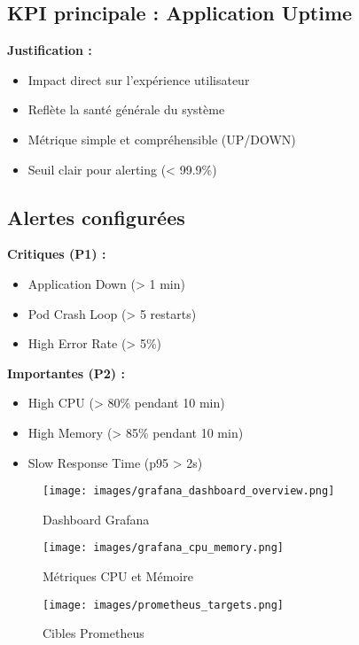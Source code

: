 \documentclass[11pt,a4paper]{article}
\begin{document}
\subsection{KPI principale : Application Uptime}
\textbf{Justification :}
\begin{itemize}
    \item Impact direct sur l'expérience utilisateur
    \item Reflète la santé générale du système
    \item Métrique simple et compréhensible (UP/DOWN)
    \item Seuil clair pour alerting (< 99.9\%)
\end{itemize}

\subsection{Alertes configurées}

\textbf{Critiques (P1) :}
\begin{itemize}
    \item Application Down (> 1 min)
    \item Pod Crash Loop (> 5 restarts)
    \item High Error Rate (> 5\%)
\end{itemize}

\textbf{Importantes (P2) :}
\begin{itemize}
    \item High CPU (> 80\% pendant 10 min)
    \item High Memory (> 85\% pendant 10 min)
    \item Slow Response Time (p95 > 2s)
\end{itemize}

\begin{figure}[H]
    \centering
    \texttt{[image: images/grafana\_dashboard\_overview.png]}
    \caption{Dashboard Grafana}
\end{figure}

\begin{figure}[H]
    \centering
    \texttt{[image: images/grafana\_cpu\_memory.png]}
    \caption{Métriques CPU et Mémoire}
\end{figure}

\begin{figure}[H]
    \centering
    \texttt{[image: images/prometheus\_targets.png]}
    \caption{Cibles Prometheus}
\end{figure}
\end{document}
